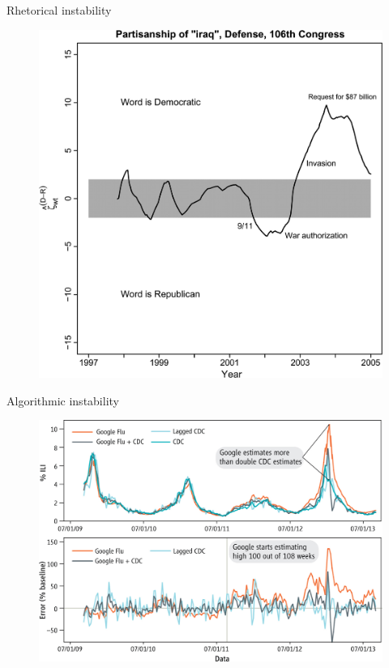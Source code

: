 \documentclass{hertieteaching}\usepackage[]{graphicx}\usepackage[]{color}
\begin{document}
\begin{frame}{Rhetorical instability}

\begin{figure}[hbt]
  \includegraphics[scale=.105]{pictures/fightin2.png}
\end{figure}
\nocite{Monroe.etal2008}
\end{frame}

\begin{frame}{Algorithmic instability}

\begin{figure}[hbt]
  \includegraphics[scale=.9]{pictures/science-google-flu.jpg}
  \caption{\cite{Lazer.etal2014}}
\end{figure}
\end{frame}
\end{document}
